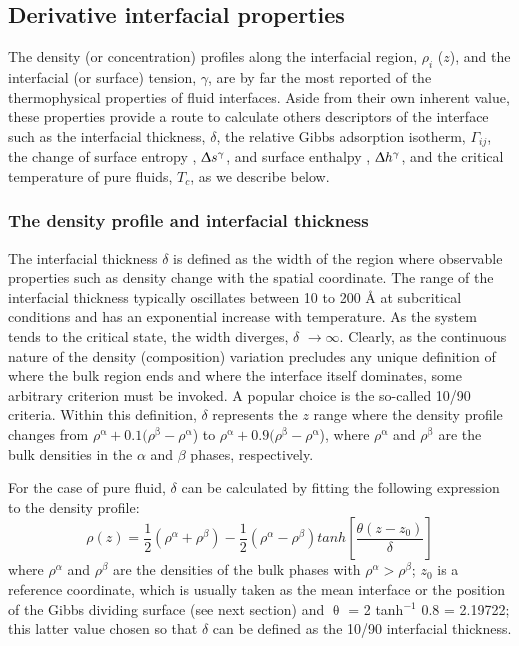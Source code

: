 \documentclass[9pt,bestpractices]{livecoms}
\begin{document}
\subsection{Derivative interfacial properties}

The density (or concentration) profiles along the interfacial region,
${\rho}_{i}$ ($z$), and the interfacial (or surface) tension,
{${\gamma}$}, are by far the most reported of the thermophysical properties of
fluid interfaces. Aside from their own inherent value, these properties provide
a route to calculate others descriptors of the interface such as the
interfacial thickness, {${\delta}$}, the relative Gibbs adsorption isotherm,
${\Gamma}_{ij}$, the change of surface entropy
, ${\Updelta}s^{{\gamma}}$, and surface enthalpy
, ${\Updelta}h^{{\gamma}}$, and the critical temperature of pure
fluids, $T_{c}$, as we describe below. 

\subsubsection{The density profile and interfacial thickness}

The interfacial thickness $\delta$ is defined as the width of the region where observable properties such as
density change with the spatial coordinate. The range of the interfacial
thickness typically oscillates between 10 to 200 \AA{} at subcritical conditions and has
an exponential increase with temperature. As the system tends to the critical
state, the width diverges, {${\delta}$} ${\rightarrow}{\infty}$. Clearly, as
the continuous nature of the density (composition) variation precludes any
unique definition of where the bulk region ends and where the interface itself
dominates, some arbitrary criterion must be invoked. A popular choice is the so-called
10/90 criteria. Within this definition, {${\delta}$} represents the
$z$ range where the density profile changes from
${\rho}^{\mathrm{{\upalpha}}} + 0.1({\rho}^{\mathrm{{\upbeta}}}
- {\rho}^{\mathrm{{\upalpha}}}$) to
${\rho}^{\mathrm{{\upalpha}}} + 0.9 ({\rho}^{\mathrm{{\upbeta}}}
- {\rho}^{\mathrm{{\upalpha}}}$), where
${\rho}^{\mathrm{{\upalpha}}}$ and ${\rho}^{\mathrm{{\upbeta}}}$ are the bulk
densities in the {${\alpha}$} and {${\beta}$} phases, respectively.

For the case of pure fluid, {${\delta}$} can be calculated by fitting the following expression to the density profile\citep{evans1992,rowlinson1982}:
\begin{equation}
\rho\left(z\right)=\frac{1}{2}\left(\rho^{\alpha}+\rho^{\beta}\right)-\frac{1}{2}\left(\rho^{\alpha}-\rho^{\beta}\right)tanh\left[\frac{\theta\left(z-z_{0}\right)}{\delta}\right]
  \label{eq:3}
\end{equation}
where $\rho^\alpha$ and $\rho^\beta$ are the densities of the bulk phases with 
$\rho^\alpha > \rho^\beta$; $z_{0}$ is a reference coordinate, which is usually taken as the
mean interface or the position of the Gibbs dividing surface (see next
section) and {${\uptheta}$} = 2 tanh$^{-1}$ 0.8 = 2.19722; this latter value
chosen so that {${\delta}$} can be defined as the 10/90 interfacial thickness.
\end{document}
